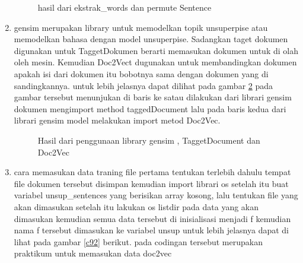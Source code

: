 \begin{enumerate}
\begin{figure}[!htbp]
      \caption{hasil dari ekstrak\_words dan permute Sentence}
      \label{c90}
      \end{figure}

\item gensim merupakan library untuk memodelkan topik unsuperpise atau memodelkan bahasa dengan model unsuperpise. Sadangkan taget dokumen digunakan untuk TaggetDokumen berarti memasukan dokumen untuk di olah oleh mesin. Kemudian Doc2Vect dugunakan untuk membandingkan dokumen apakah isi dari dokumen itu bobotnya sama dengan dokumen yang di sandingkannya. untuk lebih jelasnya dapat dilihat pada gambar \ref{c91} pada gambar tersebut menunjukan di baris ke satau dilakukan dari librari gensim dokumen mengimport method taggedDocument lalu pada baris kedua dari librari gensim model melakukan import metod Doc2Vec.

\begin{figure}[!htbp]
      \caption{Hasil dari penggunaan library gensim , TaggetDocument dan Doc2Vec}
      \label{c91}
      \end{figure}

\item cara memasukan data traning file pertama tentukan terlebih dahulu tempat file dokumen tersebut disimpan kemudian import librari os setelah itu buat variabel unsup\_sentences yang berisikan array kosong, lalu tentukan file yang akan dimasukan setelah itu lakukan os listdir pada data yang akan dimasukan kemudian semua data tersebut di inisialisasi menjadi f kemudian nama f tersebut dimasukan ke variabel unsup untuk lebih jelasnya dapat di lihat pada gambar \ref{c92} berikut. pada codingan tersebut merupakan praktikum untuk memasukan data doc2vec\par


\end{enumerate}
